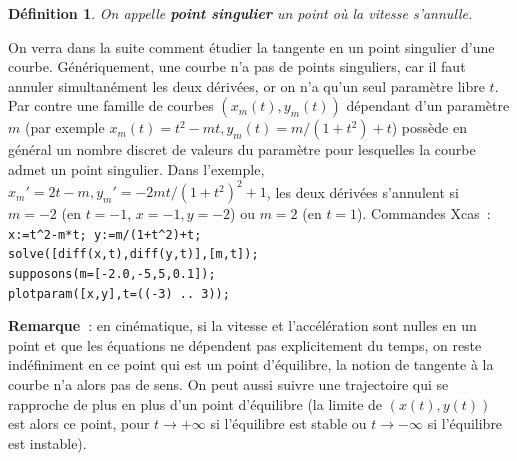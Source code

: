 \documentclass[a4paper,11pt]{book}
\newtheorem{defn}[thm]{D\'efinition}
\begin{document}
\begin{giacjshere}
\begin{defn}
On appelle {\bf point singulier} 
un point o\`u la vitesse s'annulle.
\end{defn}
On verra dans la suite comment \'etudier la tangente en un point
singulier d'une courbe. G\'en\'eriquement, une courbe n'a pas
de points singuliers, car il faut annuler simultan\'ement les
deux d\'eriv\'ees, or on n'a qu'un seul param\`etre libre $t$. Par contre
une famille de courbes $(x_m(t),y_m(t))$ d\'ependant d'un param\`etre
$m$ (par exemple $x_m(t)=t^2-mt, y_m(t)=m/(1+t^2)+t$)
poss\`ede en g\'en\'eral un nombre discret de valeurs du
param\`etre pour lesquelles la courbe admet un point singulier.
Dans l'exemple, $x_m'=2t-m, y_m'=-2mt/(1+t^2)^2+1$, les deux 
d\'eriv\'ees s'annulent si $m=-2$ 
(en $t=-1$, $x=-1, y=-2$) ou $m=2$ (en $t=1$).
Commandes Xcas~:\\
\verb|x:=t^2-m*t; y:=m/(1+t^2)+t;|\\
\verb|solve([diff(x,t),diff(y,t)],[m,t]);|\\
\verb|supposons(m=[-2.0,-5,5,0.1]);| \\
\verb|plotparam([x,y],t=((-3) .. 3));|\\

{\bf Remarque~}: en cin\'ematique, si la vitesse et l'acc\'el\'eration
sont nulles en un point
et que les \'equations ne d\'ependent pas explicitement du temps,
on reste ind\'efiniment en ce point qui est un point d'\'equilibre,
la notion de tangente \`a la courbe n'a alors pas de sens.
On peut aussi suivre une trajectoire qui se rapproche 
de plus en plus d'un point d'\'equilibre (la limite de $(x(t),y(t))$
est alors ce point, pour $t \rightarrow +\infty$ si l'\'equilibre
est stable ou $t \rightarrow - \infty$ si l'\'equilibre est instable).


\end{giacjshere}
\end{document}
